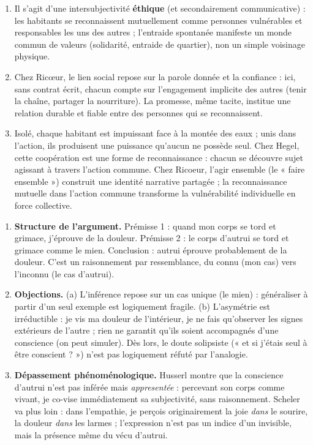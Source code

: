 \documentclass[11pt]{article}
\newcounter{popsec}
\newcounter{popsub}
\newcommand{\courssub}[1]{%
  \stepcounter{popsub}%
  \par\vspace{9pt}\noindent{\popxbold\fontsize{11.5}{13}\selectfont\color{popink}{\color{poporange}\thepopsec.\thepopsub}\hspace{6pt}#1}\par\nopagebreak\vspace{4pt}
}
\begin{document}
\courssub{Je m'entraîne}

\begin{corrige}
\begin{enumerate}
    \item Il s'agit d'une intersubjectivité \textbf{éthique} (et secondairement communicative) : les habitants se reconnaissent mutuellement comme personnes vulnérables et responsables les uns des autres ; l'entraide spontanée manifeste un monde commun de valeurs (solidarité, entraide de quartier), non un simple voisinage physique.
    \item Chez Ricœur, le lien social repose sur la parole donnée et la confiance : ici, sans contrat écrit, chacun compte sur l'engagement implicite des autres (tenir la chaîne, partager la nourriture). La promesse, même tacite, institue une relation durable et fiable entre des personnes qui se reconnaissent.
    \item Isolé, chaque habitant est impuissant face à la montée des eaux ; unis dans l'action, ils produisent une puissance qu'aucun ne possède seul. Chez Hegel, cette coopération est une forme de reconnaissance : chacun se découvre sujet agissant à travers l'action commune. Chez Ricoeur, l'agir ensemble (le « faire ensemble ») construit une identité narrative partagée ; la reconnaissance mutuelle dans l'action commune transforme la vulnérabilité individuelle en force collective.
\end{enumerate}
\end{corrige}

\begin{corrige}
\begin{enumerate}
    \item \textbf{Structure de l'argument.} Prémisse 1 : quand mon corps se tord et grimace, j'éprouve de la douleur. Prémisse 2 : le corps d'autrui se tord et grimace comme le mien. Conclusion : autrui éprouve probablement de la douleur. C'est un raisonnement par ressemblance, du connu (mon cas) vers l'inconnu (le cas d'autrui).
    \item \textbf{Objections.} (a) L'inférence repose sur un cas unique (le mien) : généraliser à partir d'un seul exemple est logiquement fragile. (b) L'asymétrie est irréductible : je vis ma douleur de l'intérieur, je ne fais qu'observer les signes extérieurs de l'autre ; rien ne garantit qu'ils soient accompagnés d'une conscience (on peut simuler). Dès lors, le doute solipsiste (« et si j'étais seul à être conscient ? ») n'est pas logiquement réfuté par l'analogie.
    \item \textbf{Dépassement phénoménologique.} Husserl montre que la conscience d'autrui n'est pas inférée mais \emph{appresentée} : percevant son corps comme vivant, je co-vise immédiatement sa subjectivité, sans raisonnement. Scheler va plus loin : dans l'empathie, je perçois originairement la joie \emph{dans} le sourire, la douleur \emph{dans} les larmes ; l'expression n'est pas un indice d'un invisible, mais la présence même du vécu d'autrui.
\end{enumerate}
\end{corrige}
\end{document}
